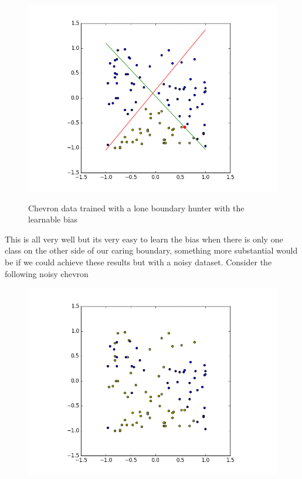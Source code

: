 \documentclass[notitlepage]{report}
\theoremstyle{definition}
\begin{document}
\begin{figure}[H]
  \centering
  \begin{minipage}[b]{0.8\textwidth}
    \includegraphics[width=\textwidth]{CHEVData-SingleBH-WithByas.png}
    \caption{}
  \end{minipage}
  \hfill

Chevron data trained with a lone boundary hunter with the learnable bias
\end{figure}

This is all very well but its very easy to learn the bias when there is only one class on the other side of our caring boundary, something more substantial would be if we could achieve these results but with a noisy dataset. Consider the following noisy chevron

\begin{figure}[H]
  \centering
  \begin{minipage}[b]{0.8\textwidth}
    \includegraphics[width=\textwidth]{NoisyChev-RawData.png}
    \caption{}
  \end{minipage}
  \hfill
\end{figure}
\end{document}
